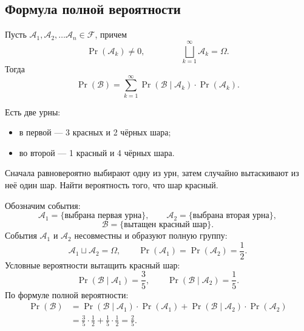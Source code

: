 \subsection{Формула полной вероятности}
\begin{definition}
    Пусть $\mathcal{A}_1, \mathcal{A}_2, \dots \mathcal{A}_n\in \mathcal{F}$, причем
    \[
        \Pr(\mathcal{A}_k) \neq 0, \qquad
        \
        \qquad
        \bigsqcup_{k=1}^{\infty} \mathcal{A}_k = \Omega.
    \]
    Тогда
    \[
        \Pr(\mathcal{B})
        =
        \sum_{k=1}^{\infty}
        \Pr(\mathcal{B} \mid \mathcal{A}_k) \cdot
        \Pr(\mathcal{A}_k).
    \]
\end{definition}
\begin{example}[Пример]
    Есть две урны:
    \begin{itemize}
        \item в первой --- 3 красных и 2 чёрных шара;
        \item во второй --- 1 красный и 4 чёрных шара.
    \end{itemize}
    Сначала равновероятно выбирают одну из урн, затем
    случайно вытаскивают из неё один шар.
    Найти вероятность того, что шар красный.
\end{example}

\begin{solution}
    Обозначим события:
    \[
        \mathcal{A}_1 = \{\text{выбрана первая урна}\},
        \qquad
        \mathcal{A}_2 = \{\text{выбрана вторая урна}\},
    \]
    \[
        \mathcal{B} = \{\text{вытащен красный шар}\}.
    \]
    События $\mathcal{A}_1$ и $\mathcal{A}_2$ несовместны
    и образуют полную группу:
    \[
        \mathcal{A}_1 \sqcup \mathcal{A}_2 = \Omega,
        \qquad
        \Pr(\mathcal{A}_1) = \Pr(\mathcal{A}_2) = \frac{1}{2}.
    \]
    Условные вероятности вытащить красный шар:
    \[
        \Pr(\mathcal{B} \mid \mathcal{A}_1) = \frac{3}{5},
        \qquad
        \Pr(\mathcal{B} \mid \mathcal{A}_2) = \frac{1}{5}.
    \]
    По формуле полной вероятности:
    \[
        \begin{aligned}
            \Pr(\mathcal{B})
            &=
            \Pr(\mathcal{B} \mid \mathcal{A}_1)
            \cdot \Pr(\mathcal{A}_1)
            +
            \Pr(\mathcal{B} \mid \mathcal{A}_2)
            \cdot \Pr(\mathcal{A}_2)
            \\
            &=
            \frac{3}{5} \cdot \frac{1}{2}
            +
            \frac{1}{5} \cdot \frac{1}{2}
            =
            \frac{2}{5}.
        \end{aligned}
    \]
\end{solution}


